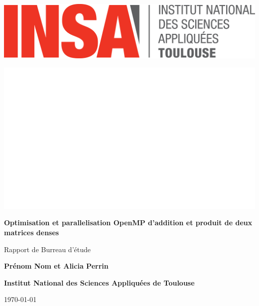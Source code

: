 \documentclass{report}
\begin{document}
\begin{titlepage}
    \centering

    \noindent %
    \begin{minipage}{0.5\textwidth}
        \includegraphics[width=0.5\linewidth]{images/logo_INSA.png} %
    \end{minipage}%
    \hfill %
    \begin{minipage}{0.5\textwidth}
        \flushright %
        \includegraphics[width=0.5\linewidth]{images/blanc.jpg} %
    \end{minipage}


    \vspace*{2cm} %
    {\Huge\bfseries Optimisation et parallelisation OpenMP d'addition et produit
de deux matrices denses \par}
    \vspace{1cm}
    {\huge Rapport de Burreau d'étude\par}
    \vspace{2cm}
    {\Large \textbf{Prénom Nom et Alicia Perrin} \par}
    \vspace{2cm}
    
    {\Large \textbf{Institut National des Sciences Appliquées de Toulouse} \par}
    \vspace{1cm}
    {\large \today \par}
\end{titlepage}

\begin{abstract}
  Dans ce rapport, nous allons tester plusieurs méthodes différentes afin d'optimiser des calculs matriciels (somme, produit scalaire, produit matricielle). A COMPLETER
\end{abstract}
\end{document}
